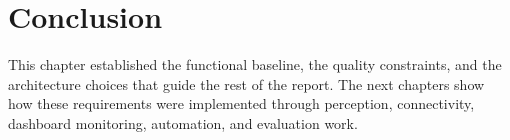 \section{Conclusion}
This chapter established the functional baseline, the quality constraints, and the architecture choices that guide the rest of the report. The next chapters show how these requirements were implemented through perception, connectivity, dashboard monitoring, automation, and evaluation work.



